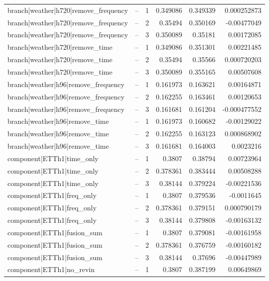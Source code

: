 \begin{longtable}{llrrrr}
branch|weather|h720|remove\_frequency & -- & 1 & 0.349086 & 0.349339 & 0.000252873 \\
branch|weather|h720|remove\_frequency & -- & 2 & 0.35494 & 0.350169 & -0.00477049 \\
branch|weather|h720|remove\_frequency & -- & 3 & 0.350089 & 0.35181 & 0.00172085 \\
branch|weather|h720|remove\_time & -- & 1 & 0.349086 & 0.351301 & 0.00221485 \\
branch|weather|h720|remove\_time & -- & 2 & 0.35494 & 0.35566 & 0.000720203 \\
branch|weather|h720|remove\_time & -- & 3 & 0.350089 & 0.355165 & 0.00507608 \\
branch|weather|h96|remove\_frequency & -- & 1 & 0.161973 & 0.163621 & 0.00164871 \\
branch|weather|h96|remove\_frequency & -- & 2 & 0.162255 & 0.163461 & 0.00120653 \\
branch|weather|h96|remove\_frequency & -- & 3 & 0.161681 & 0.161204 & -0.000477552 \\
branch|weather|h96|remove\_time & -- & 1 & 0.161973 & 0.160682 & -0.00129022 \\
branch|weather|h96|remove\_time & -- & 2 & 0.162255 & 0.163123 & 0.000868902 \\
branch|weather|h96|remove\_time & -- & 3 & 0.161681 & 0.164003 & 0.0023216 \\
component|ETTh1|time\_only & -- & 1 & 0.3807 & 0.38794 & 0.00723964 \\
component|ETTh1|time\_only & -- & 2 & 0.378361 & 0.383444 & 0.00508288 \\
component|ETTh1|time\_only & -- & 3 & 0.38144 & 0.379224 & -0.00221536 \\
component|ETTh1|freq\_only & -- & 1 & 0.3807 & 0.379536 & -0.0011645 \\
component|ETTh1|freq\_only & -- & 2 & 0.378361 & 0.379151 & 0.000790179 \\
component|ETTh1|freq\_only & -- & 3 & 0.38144 & 0.379808 & -0.00163132 \\
component|ETTh1|fusion\_sum & -- & 1 & 0.3807 & 0.379081 & -0.00161958 \\
component|ETTh1|fusion\_sum & -- & 2 & 0.378361 & 0.376759 & -0.00160182 \\
component|ETTh1|fusion\_sum & -- & 3 & 0.38144 & 0.37696 & -0.00447989 \\
component|ETTh1|no\_revin & -- & 1 & 0.3807 & 0.387199 & 0.00649869 \\

\end{longtable}

